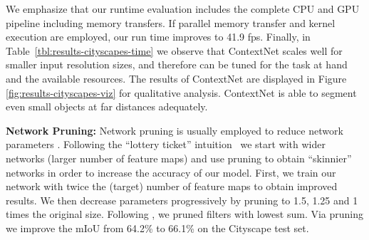 \documentclass[runningheads]{llncs}
\newcommand{\subsubsubsection}[1]{\vspace{0.2em}\noindent\textbf{\textcolor[rgb]{0,.1,.4}{#1:}}}
\begin{document}
\begin{table}[t]
\begin{center}
\end{center}
      \caption{Runtime on Nvidia Titan X (Maxwell, 3,072 CUDA cores) with TensorFlow~\cite{tensorflow2015}, including sequential CPU/GPU memory transfer and kernel execution. (Results with `*' are taken from existing literature -- it is not known if memory transfer is considered. Our measure with `' denotes kernel execution time alone.)}
  \label{tbl:results-cityscapes-time}
\end{table}

We emphasize that our runtime evaluation includes the complete CPU and GPU pipeline including memory transfers. If parallel memory transfer and kernel execution are employed, our run time improves to 41.9 fps. Finally, in Table~\ref{tbl:results-cityscapes-time} we observe that ContextNet scales well for smaller input resolution sizes, and therefore can be tuned for the task at hand and the available resources. The results of ContextNet are displayed in Figure \ref{fig:results-cityscapes-viz} for qualitative analysis. ContextNet is able to segment even small objects at far distances adequately.

\subsubsubsection{Network Pruning} Network pruning is usually employed to reduce network parameters \cite{li2017,zhao2017b}. Following the ``lottery ticket'' intuition~\cite{frankle2018lottery} we start with wider networks (larger number of feature maps) and use pruning to obtain ``skinnier'' networks in order to increase the accuracy of our model. 
First, we train our network with twice the (target) number of feature maps to obtain improved results. We then decrease parameters progressively by pruning to 1.5, 1.25 and 1 times the original size. Following \cite{li2017}, we pruned filters with lowest  sum. Via pruning we improve the mIoU from 64.2\% to 66.1\% on the Cityscape test set.
\end{document}
